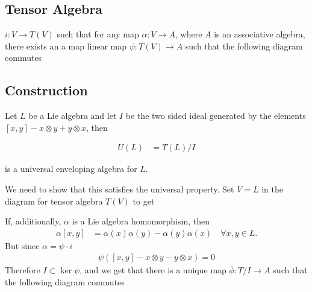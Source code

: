 \subsection{Tensor Algebra}
\label{sub:tensor_algebra}
$i:V\to T(V)$ such that for any map $\alpha: V\to A$, where $A$ is an associative algebra, there exists an a map linear map $\psi: T(V)\to A$ such that the following diagram commutes



\begin{center}
\end{center}


\subsection{Construction}
\label{sub:construction}
Let $L$ be a Lie algebra and let $I$ be the two sided ideal generated by the elements $[x,y]-x\otimes y + y\otimes x$, then

\begin{align}
    U(L) &= T(L)/I
\end{align}

is a universal enveloping algebra for $L$.

We need to show that this satisfies the universal property. Set $V=L$ in the diagram for tensor algebra $T(V)$ to get

\begin{center}
\end{center}
If, additionally, $\alpha$ is a Lie algebra homomorphism, then 
\begin{align}
    \alpha[x,y] &= \alpha(x)\alpha(y) -\alpha(y) \alpha(x)\quad\forall x,y\in L.
\end{align}
But since $\alpha=\psi\cdot i$
\begin{align}
    \psi([x,y] -x\otimes y - y\otimes x) =0
\end{align}
Therefore $I\subset \ker \psi$, and we get that there is a unique map $\overline\phi: T/I \to A$ such that the following diagram commutes

